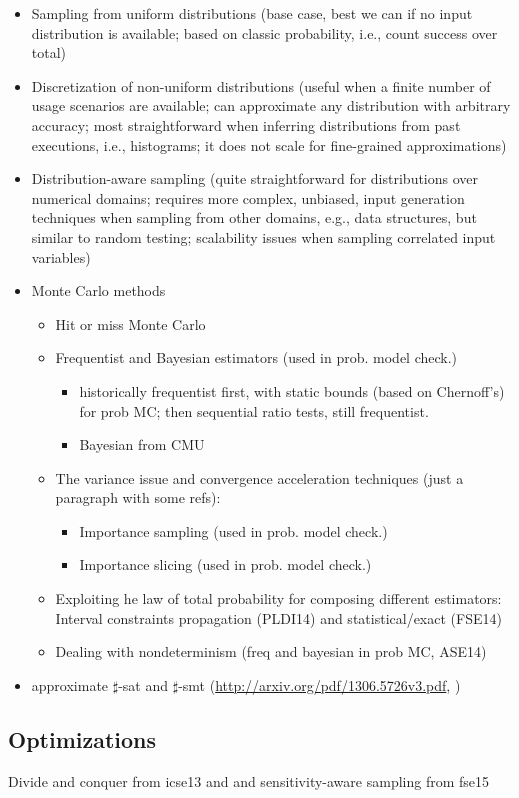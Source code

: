 	\begin{itemize}
		\item Sampling from uniform distributions (base case, best we can if no input distribution is available; based on classic probability, i.e., count success over total)
		\item Discretization of non-uniform distributions (useful when a finite number of usage scenarios are available; can approximate any distribution with arbitrary accuracy; most straightforward when inferring distributions from past executions, i.e., histograms; it does not scale for fine-grained approximations)
		\item Distribution-aware sampling (quite straightforward for distributions over numerical domains; requires more complex, unbiased, input generation techniques when sampling from other domains, e.g., data structures, but similar to random testing; scalability issues when sampling correlated input variables)
      
		\item Monte Carlo methods
			\begin{itemize}
				\item Hit or miss Monte Carlo
				\item Frequentist and Bayesian estimators (used in prob. model check.)
					\begin{itemize}
						\item historically frequentist first, with static bounds (based on Chernoff's) for prob MC; then sequential ratio tests, still frequentist.
						\item Bayesian from CMU
					\end{itemize}
				\item The variance issue and convergence acceleration techniques (just a paragraph with some refs):
					\begin{itemize}
						\item Importance sampling (used in prob. model check.)
						\item Importance slicing (used in prob. model check.)
					\end{itemize}

				\item Exploiting he law of total probability for composing different estimators: Interval constraints propagation (PLDI14) and statistical/exact (FSE14)
				\item Dealing with nondeterminism (freq and bayesian in prob MC, ASE14)	
			\end{itemize}
			
			\item approximate $\sharp$-sat and $\sharp$-smt (\url{http://arxiv.org/pdf/1306.5726v3.pdf}, )
	\end{itemize}





\subsection{Optimizations}\label{sec:computingprobabilitiesOptimizations}

Divide and conquer from icse13 and and sensitivity-aware sampling from fse15
